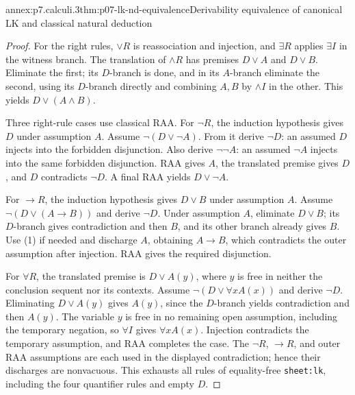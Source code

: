\begin{annexitem}{annex:p7.calculi.3}{thm:p07-lk-nd-equivalence}{Derivability equivalence of canonical LK and classical natural deduction}
\begin{proof}
For the right rules, \(\lor R\) is reassociation and injection, and
\(\exists R\) applies \(\exists I\) in the witness branch.  The translation of
\(\land R\) has premises \(D\lor A\) and \(D\lor B\).  Eliminate the first;
its \(D\)-branch is done, and in its \(A\)-branch eliminate the second, using
its \(D\)-branch directly and combining \(A,B\) by \(\land I\) in the other.
This yields \(D\lor(A\land B)\).

Three right-rule cases use classical RAA.  For \(\neg R\), the induction
hypothesis gives \(D\) under assumption \(A\).  Assume
\(\neg(D\lor\neg A)\).  From it derive \(\neg D\): an assumed \(D\) injects
into the forbidden disjunction.  Also derive \(\neg\neg A\): an assumed
\(\neg A\) injects into the same forbidden disjunction.  RAA gives \(A\), the
translated premise gives \(D\), and \(D\) contradicts \(\neg D\).  A final
RAA yields \(D\lor\neg A\).

For \(\to R\), the induction hypothesis gives \(D\lor B\) under assumption
\(A\).  Assume \(\neg(D\lor(A\to B))\) and derive \(\neg D\).  Under
assumption \(A\), eliminate \(D\lor B\); its \(D\)-branch gives
contradiction and then \(B\), and its other branch already gives \(B\).
Use (1) if needed and discharge \(A\), obtaining \(A\to B\), which contradicts
the outer assumption after injection.  RAA gives the required disjunction.

For \(\forall R\), the translated premise is \(D\lor A(y)\), where \(y\) is
free in neither the conclusion sequent nor its contexts.  Assume
\(\neg(D\lor\forall xA(x))\) and derive \(\neg D\).  Eliminating
\(D\lor A(y)\) gives \(A(y)\), since the \(D\)-branch yields contradiction
and then \(A(y)\).  The variable \(y\) is free in no remaining open assumption,
including the temporary negation, so \(\forall I\) gives \(\forall xA(x)\).
Injection contradicts the temporary assumption, and RAA completes the case.
The \(\neg R\), \(\to R\), and outer RAA assumptions are each used in the
displayed contradiction; hence their discharges are nonvacuous.  This exhausts
all rules of equality-free \texttt{sheet:lk}, including the four quantifier
rules and empty \(D\).


\end{proof}
\end{annexitem}
